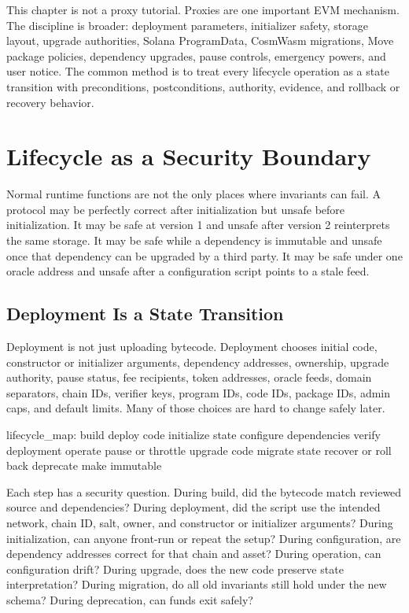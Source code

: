 This chapter is not a proxy tutorial. Proxies are one important EVM mechanism. The discipline is broader: deployment parameters, initializer safety, storage layout, upgrade authorities, Solana ProgramData, CosmWasm migrations, Move package policies, dependency upgrades, pause controls, emergency powers, and user notice. The common method is to treat every lifecycle operation as a state transition with preconditions, postconditions, authority, evidence, and rollback or recovery behavior.

\section{Lifecycle as a Security Boundary}

Normal runtime functions are not the only places where invariants can fail. A protocol may be perfectly correct after initialization but unsafe before initialization. It may be safe at version 1 and unsafe after version 2 reinterprets the same storage. It may be safe while a dependency is immutable and unsafe once that dependency can be upgraded by a third party. It may be safe under one oracle address and unsafe after a configuration script points to a stale feed.

\subsection{Deployment Is a State Transition}

Deployment is not just uploading bytecode. Deployment chooses initial code, constructor or initializer arguments, dependency addresses, ownership, upgrade authority, pause status, fee recipients, token addresses, oracle feeds, domain separators, chain IDs, verifier keys, program IDs, code IDs, package IDs, admin caps, and default limits. Many of those choices are hard to change safely later.

\begin{codeblock}
lifecycle_map:
    build
    deploy code
    initialize state
    configure dependencies
    verify deployment
    operate
    pause or throttle
    upgrade code
    migrate state
    recover or roll back
    deprecate
    make immutable
\end{codeblock}

Each step has a security question. During build, did the bytecode match reviewed source and dependencies? During deployment, did the script use the intended network, chain ID, salt, owner, and constructor or initializer arguments? During initialization, can anyone front-run or repeat the setup? During configuration, are dependency addresses correct for that chain and asset? During operation, can configuration drift? During upgrade, does the new code preserve state interpretation? During migration, do all old invariants still hold under the new schema? During deprecation, can funds exit safely?

